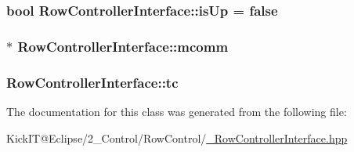 \subsubsection[{\texorpdfstring{is\+Up}{isUp}}]{\setlength{\rightskip}{0pt plus 5cm}bool Row\+Controller\+Interface\+::is\+Up = false\hspace{0.3cm}{\ttfamily [protected]}}\hypertarget{class_row_controller_interface_a7d25dba642a119990388be3452963cc5}{}\label{class_row_controller_interface_a7d25dba642a119990388be3452963cc5}
\subsubsection[{\texorpdfstring{mcomm}{mcomm}}]{$\ast$ Row\+Controller\+Interface\+::mcomm\hspace{0.3cm}{\ttfamily [protected]}}\hypertarget{class_row_controller_interface_a14b23ce7b593d4be9907f6ffea7f9531}{}\label{class_row_controller_interface_a14b23ce7b593d4be9907f6ffea7f9531}
\subsubsection[{\texorpdfstring{tc}{tc}}]{ Row\+Controller\+Interface\+::tc\hspace{0.3cm}{\ttfamily [protected]}}\hypertarget{class_row_controller_interface_abb1c698ede5467ee0f60acf8b5a38f96}{}\label{class_row_controller_interface_abb1c698ede5467ee0f60acf8b5a38f96}


The documentation for this class was generated from the following file\+:\begin{DoxyCompactItemize}
\item 
Kick\+I\+T@\+Eclipse/2\+\_\+\+Control/\+Row\+Control/\hyperlink{___row_controller_interface_8hpp}{\+\_\+\+Row\+Controller\+Interface.\+hpp}\end{DoxyCompactItemize}
